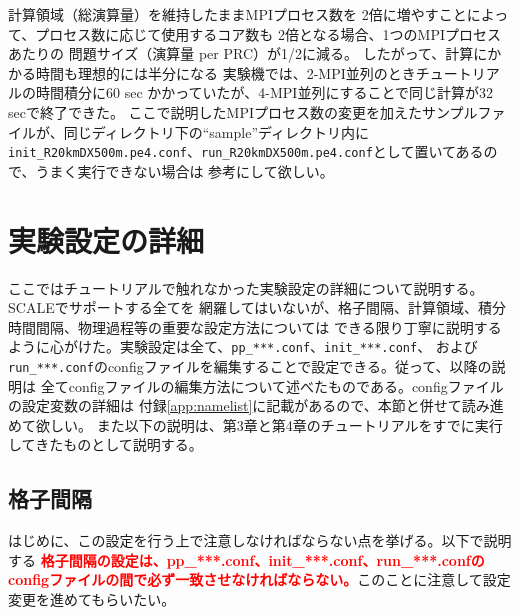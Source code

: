 計算領域（総演算量）を維持したままMPIプロセス数を
2倍に増やすことによって、プロセス数に応じて使用するコア数も
2倍となる場合、1つのMPIプロセスあたりの
問題サイズ（演算量 per PRC）が1/2に減る。
したがって、計算にかかる時間も理想的には半分になる
実験機では、2-MPI並列のときチュートリアルの時間積分に60 sec かかっていたが、4-MPI並列にすることで同じ計算が32 secで終了できた。
ここで説明したMPIプロセス数の変更を加えたサンプルファイルが、同じディレクトリ下の``sample''ディレクトリ内に
\verb|init_R20kmDX500m.pe4.conf|、\verb|run_R20kmDX500m.pe4.conf|として置いてあるので、うまく実行できない場合は
参考にして欲しい。



\section{実験設定の詳細} \label{sec:adv_settings}

ここではチュートリアルで触れなかった実験設定の詳細について説明する。SCALEでサポートする全てを
網羅してはいないが、格子間隔、計算領域、積分時間間隔、物理過程等の重要な設定方法については
できる限り丁寧に説明するように心がけた。実験設定は全て、\verb|pp_***.conf|、\verb|init_***.conf|、
および\verb|run_***.conf|のconfigファイルを編集することで設定できる。従って、以降の説明は
全てconfigファイルの編集方法について述べたものである。configファイルの設定変数の詳細は
付録\ref{app:namelist}に記載があるので、本節と併せて読み進めて欲しい。
また以下の説明は、第3章と第4章のチュートリアルをすでに実行してきたものとして説明する。


\subsection{格子間隔} \label{sec:adv_gridspace}
はじめに、この設定を行う上で注意しなければならない点を挙げる。以下で説明する
\textcolor{red}{\bf 格子間隔の設定は、pp\_***.conf、init\_***.conf、run\_***.confの
configファイルの間で必ず一致させなければならない。}このことに注意して設定変更を進めてもらいたい。

